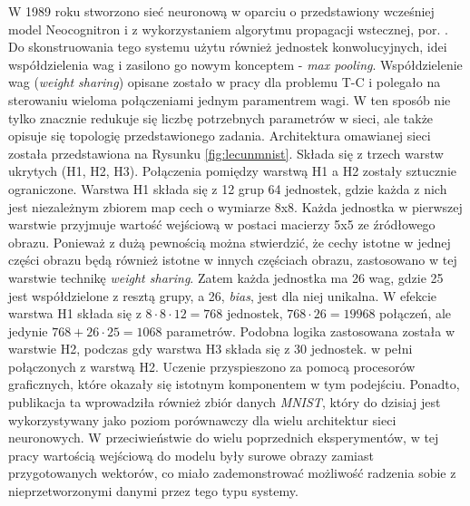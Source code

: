 \documentclass[12pt,a4paper,twoside]{article}
\begin{document}
W 1989 roku stworzono sieć neuronową w oparciu o przedstawiony wcześniej model Neocognitron \citet{fukushima1980} i z wykorzystaniem algorytmu propagacji wstecznej, por. \citet{lecun1989b}. Do skonstruowania tego systemu użytu również jednostek konwolucyjnych, idei współdzielenia wag i zasilono go nowym konceptem - \textit{max pooling}. Współdzielenie wag (\textit{weight sharing}) opisane zostało w pracy \citet{rumelhart1986} dla problemu T-C i polegało na sterowaniu wieloma połączeniami jednym paramentrem wagi. W ten sposób nie tylko znacznie redukuje się liczbę potrzebnych parametrów w sieci, ale także opisuje się topologię przedstawionego zadania. Architektura omawianej sieci została przedstawiona na Rysunku \ref{fig:lecunmnist}. Składa się z trzech warstw ukrytych (H1, H2, H3). Połączenia pomiędzy warstwą H1 a H2 zostały sztucznie ograniczone. Warstwa H1 składa się z 12 grup 64 jednostek, gdzie każda z nich jest niezależnym zbiorem map cech o wymiarze 8x8. Każda jednostka w pierwszej warstwie przyjmuje wartość wejściową w postaci macierzy 5x5 ze źródłowego obrazu. Ponieważ z dużą pewnością można stwierdzić, że cechy istotne w jednej części obrazu będą również istotne w innych częściach obrazu, zastosowano w tej warstwie technikę \textit{weight sharing}. Zatem każda jednostka ma 26 wag, gdzie 25 jest współdzielone z resztą grupy, a 26, \textit{bias}, jest dla niej unikalna. W efekcie warstwa H1 składa się z $8\cdot8\cdot12=768$ jednostek, $768\cdot26=19968$ połączeń, ale jedynie $768+26\cdot25=1068$  parametrów. Podobna logika zastosowana została w warstwie H2, podczas gdy warstwa H3 składa się z 30 jednostek. w pełni połączonych z warstwą H2. Uczenie przyspieszono za pomocą procesorów graficznych, które okazały się istotnym komponentem w tym podejściu. Ponadto, publikacja ta wprowadziła również zbiór danych \textit{MNIST}, który do dzisiaj jest wykorzystywany jako poziom porównawczy dla wielu architektur sieci neuronowych. W przeciwieństwie do wielu poprzednich eksperymentów, w tej pracy wartością wejściową do modelu były surowe obrazy zamiast przygotowanych wektorów, co miało zademonstrować możliwość radzenia sobie z nieprzetworzonymi danymi przez tego typu systemy.
\end{document}
